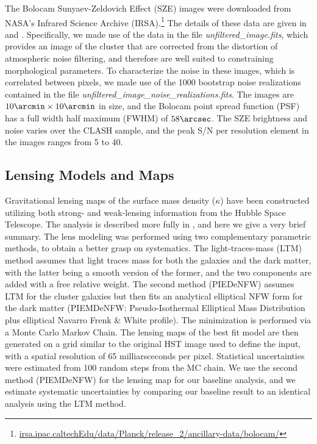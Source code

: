 \documentclass[iop,twocolumn]{emulateapj}
\begin{document}
{The Bolocam Sunyaev-Zeldovich Effect (SZE) images were downloaded from NASA's Infrared Science Archive (IRSA).\footnote{\url{irsa.ipac.caltechEdu/data/Planck/release_2/ancillary-data/bolocam/}}
The details of these data are given in \citet{Sayers2013} and \citet{Czakon2015}.
Specifically, we made use of the data in the file {\it unfiltered\_image.fits}, 
which provides an image of the cluster that are corrected from the
distortion of atmospheric noise filtering, and therefore are 
well suited to constraining morphological parameters.
To characterize the noise in these images, which is correlated
between pixels, we made use of the 1000 bootstrap noise realizations
contained in the file {\it unfiltered\_image\_noise\_realizations.fits}.
The images are $10\arcmin \times 10\arcmin$ in size, and the Bolocam point spread function (PSF)
has a full width half maximum (FWHM) of $58\arcsec$. The SZE brightness and noise varies over the 
CLASH sample, and the peak S/N per resolution element in the images ranges from 5 to 40.

\subsection{Lensing Models and Maps \label{section:lensmodel}}

Gravitational lensing maps of the surface mass density ($\kappa$) have been constructed utilizing both
strong- and weak-lensing information from the Hubble Space Telescope. The analysis is described more fully in \citet{2015ApJ...801...44Z}, and here we give a very brief summary. The lens modeling was performed using two complementary parametric methods, to obtain a better grasp on systematics. The light-traces-mass (LTM) method assumes that light traces mass for both the galaxies and the dark matter, with the latter being a smooth version of the former, and the two components are added with a free relative weight. The second method (PIEDeNFW) assumes LTM for the cluster galaxies but then fits an analytical elliptical NFW form \citep{1997ApJ...490..493N} for the dark matter  (PIEMDeNFW: Pseudo-Isothermal  Elliptical  Mass  Distribution plus elliptical Navarro Frenk \& White profile). 
The minimization is performed via a Monte Carlo Markov Chain. The lensing maps of the best fit model are then generated on a grid similar to the original HST image used to define the input,  with a spatial resolution of 65 milliarsceconds per pixel. Statistical uncertainties were estimated from 100 random steps from the MC chain.
We use the second method (PIEMDeNFW) for the lensing map for our baseline analysis, and we estimate systematic uncertainties by comparing our baseline result to an identical analysis using the LTM method.

}
\end{document}
